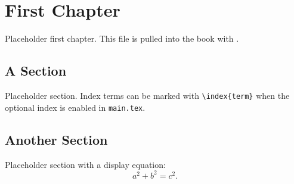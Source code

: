 \chapter{First Chapter}
\label{ch:first}

Placeholder first chapter. This file is pulled into the book with
\verb||.

\section{A Section}
\label{sec:first-section}
Placeholder section. Index terms can be marked with \verb|\index{term}| when
the optional index is enabled in \texttt{main.tex}.

\section{Another Section}
\label{sec:first-another}
Placeholder section with a display equation:
\begin{equation}
  \label{eq:book-example}
  a^{2} + b^{2} = c^{2}.
\end{equation}
